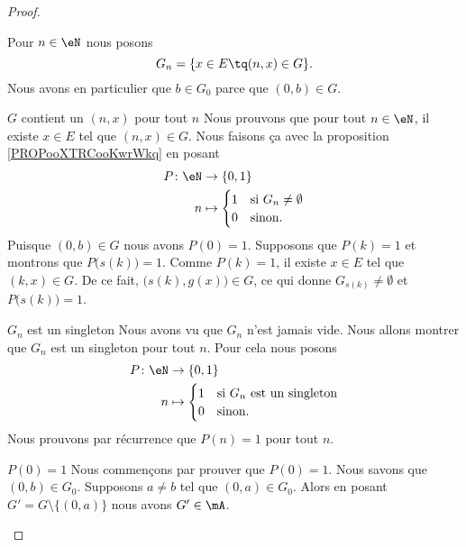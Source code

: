 \begin{proof}
\begin{subproof}
		Pour \( n\in \eN\) nous posons
		\begin{equation}
			G_n=\{ x\in E\tq (n,x)\in G \}.
		\end{equation}
		Nous avons en particulier que \( b\in G_0\) parce que \( (0,b)\in G\).
		\item[\( G\) contient un \( (n,x)\) pour tout \( n\)]
		Nous prouvons que pour tout \( n\in \eN\), il existe \( x\in E\) tel que \( (n,x)\in G\). Nous faisons ça avec la proposition \ref{PROPooXTRCooKwrWkq} en posant
		\begin{equation}
			\begin{aligned}
				P\colon \eN & \to \{ 0,1 \}                      \\
				n           & \mapsto \begin{cases}
					1 & \text{si } G_n\neq\emptyset \\
					0 & \text{sinon.}
				\end{cases}
			\end{aligned}
		\end{equation}
		Puisque \( (0,b)\in G\) nous avons \( P(0)=1\). Supposons que \( P(k)=1\) et montrons que \( P\big( s(k) \big)=1\). Comme \( P(k)=1\), il existe \( x\in E\) tel que \( (k,x)\in G\). De ce fait, \( \big( s(k),g(x) \big)\in G\), ce qui donne \( G_{s(k)}\neq \emptyset\) et \( P\big( s(k) \big)=1\).
		\item[\( G_n\) est un singleton]
		Nous avons vu que \( G_n\) n'est jamais vide. Nous allons montrer que \( G_n\) est un singleton pour tout \( n\). Pour cela nous posons
		\begin{equation}
			\begin{aligned}
				P\colon \eN & \to \{ 0,1 \}                      \\
				n           & \mapsto \begin{cases}
					1 & \text{si }  G_n \text{ est un singleton} \\
					0 & \text{sinon. }
				\end{cases}
			\end{aligned}
		\end{equation}
		Nous prouvons par récurrence que \( P(n)=1\) pour tout \( n\).
		\begin{subproof}
			\item[\( P(0)=1\)]
			Nous commençons par prouver que \( P(0)=1\). Nous savons que \( (0,b)\in G_0\). Supposons \( a\neq b\) tel que \( (0,a)\in G_0\). Alors en posant \( G'=G\setminus\{ (0,a) \}\) nous avons \( G'\in \mA\).


\end{subproof}
\end{subproof}
\end{proof}

